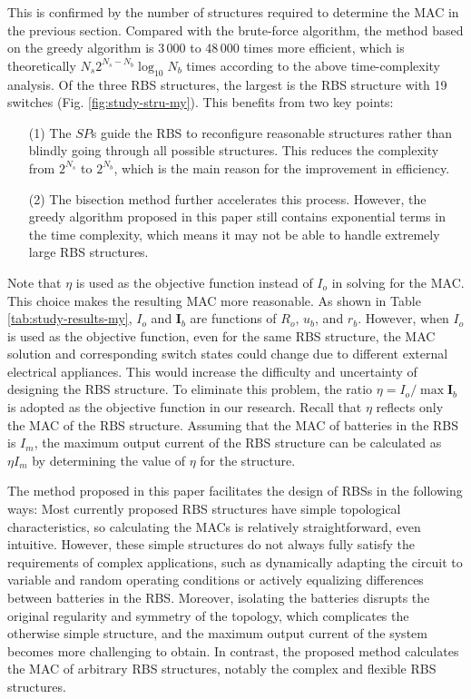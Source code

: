 \documentclass{article}
\begin{document}
This is confirmed by the number of structures required to determine the MAC in the previous section. 
Compared with the brute-force algorithm, the method based on the greedy algorithm is 3\,000 to 48\,000 times more efficient, which is theoretically $N_s 2^{N_s - N_b} \log_{10} N_b$ times according to the above time-complexity analysis.
Of the three RBS structures, the largest is the RBS structure with 19 switches (Fig. \ref{fig:study-stru-my}).
This benefits from two key points:
\begin{enumerate}
\item[(1)] The $SP$s guide the RBS to reconfigure reasonable structures rather than blindly going through all possible structures. This reduces the complexity from $2^{N_s}$ to $2^{N_b}$, which is the main reason for the improvement in efficiency.
\item[(2)] The bisection method further accelerates this process.
However, the greedy algorithm proposed in this paper still contains exponential terms in the time complexity, which means it may not be able to handle extremely large RBS structures. 
\end{enumerate}



Note that $\eta$ is used as the objective function instead of $I_o$ in solving for the MAC. 
This choice makes the resulting MAC more reasonable. 
As shown in Table \ref{tab:study-results-my}, $I_o$ and $\bm{I}_b$ are functions of $R_o$, $u_b$, and $r_b$. 
However, when $I_o$ is used as the objective function, even for the same RBS structure, the MAC solution and corresponding switch states could change due to different external electrical appliances.
This would increase the difficulty and uncertainty of designing the RBS structure. 
To eliminate this problem, the ratio $\eta=I_o/\max\bm{I}_b$ is adopted as the objective function in our research.
Recall that $\eta$ reflects only the MAC of the RBS structure. 
Assuming that the MAC of batteries in the RBS is $I_m$, the maximum output current of the RBS structure can be calculated as $\eta I_m$ by determining the value of $\eta$ for the structure. 


The method proposed in this paper facilitates the design of RBSs in the following ways:
Most currently proposed RBS structures \cite{ciNovelDesignAdaptive2007,alahmadBatterySwitchArray2008,kimDependableEfficientScalable2010b,kimBalancedReconfigurationStorage2011a,taesickimSeriesconnectedSelfreconfigurableMulticell2012a,6843711} have simple topological characteristics, so calculating the MACs is relatively straightforward, even intuitive.
However, these simple structures do not always fully satisfy the requirements of complex applications, such as dynamically adapting the circuit to variable and random operating conditions or actively equalizing differences between batteries in the RBS.
Moreover, isolating the batteries disrupts the original regularity and symmetry of the topology, which complicates the otherwise simple structure, and the maximum output current of the system becomes more challenging to obtain.
In contrast, the proposed method calculates the MAC of arbitrary RBS structures, notably the complex and flexible RBS structures.
\end{document}

